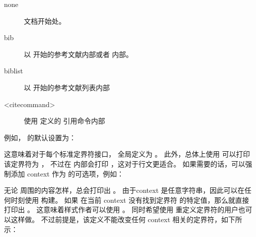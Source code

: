 \begin{description}
	\item[none] %
	文档开始处。
	\item[bib] %
	以  开始的参考文献内部或者  内部。
	\item[biblist] %
	以  开始的参考文献列表内部
	\item[<citecommand>] %
	使用  定义的  引用命令内部
\end{description}

例如， 的默认设置为：

\begin{ltxexample}[style=latex]{}
\end{ltxexample}
%
这意味着对于每个标准定界符接口， 全局定义为 。
此外，总体上使用  可以打印该定界符为 ，
不过在  内部会打印 ，这对于行文更适合。
如果需要的话，可以强制添加 context 作为 的可选项，例如：

\begin{ltxexample}[style=latex]{}
\end{ltxexample}
%
无论  周围的内容怎样，总会打印出 。
由于context 是任意字符串，因此可以在任何时刻使用  构建。
如果  在当前 context 没有找到定界符  的特定值，那么就直接打印出 。
这意味着样式作者可以使用 。
同时希望使用  重定义定界符的用户也可以这样做。
不过前提是，该定义不能改变任何 context 相关的定界符，如下所示：

